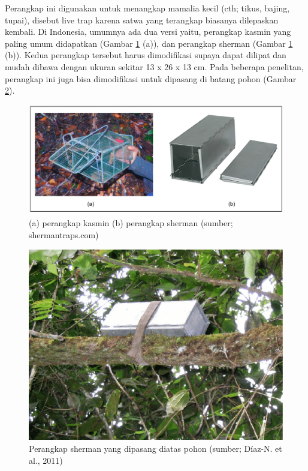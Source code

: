 \documentclass[
]{book}
\begin{document}
Perangkap ini digunakan untuk menangkap mamalia kecil (cth; tikus, bajing, tupai), disebut live trap karena satwa yang terangkap biasanya dilepaskan kembali. Di Indonesia, umumnya ada dua versi yaitu, perangkap kasmin yang paling umum didapatkan (Gambar \ref{fig:lvtrap} (a)), dan perangkap sherman (Gambar \ref{fig:lvtrap} (b)). Kedua perangkap tersebut harus dimodifikasi supaya dapat dilipat dan mudah dibawa dengan ukuran sekitar 13 x 26 x 13 cm. Pada beberapa penelitan, perangkap ini juga bisa dimodifikasi untuk dipasang di batang pohon (Gambar \ref{fig:stot}).

\begin{figure}

{\centering \includegraphics[width=1\linewidth]{images/livetrap} 

}

\caption{(a) perangkap kasmin (b) perangkap sherman (sumber; shermantraps.com)}\label{fig:lvtrap}
\end{figure}

\begin{figure}

{\centering \includegraphics[width=1\linewidth]{images/stontrees} 

}

\caption{Perangkap sherman yang dipasang diatas pohon (sumber; Díaz-N. et al., 2011)}\label{fig:stot}
\end{figure}
\end{document}
